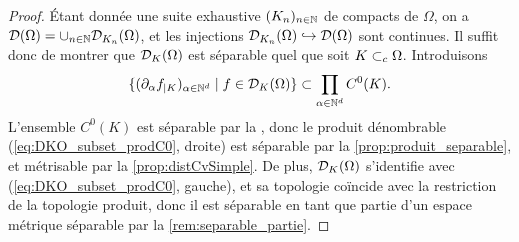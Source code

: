 \begin{proof}
	Étant donnée une suite exhaustive $(K_n)_{n\in \mathbb{N}}$ de compacts de $\Omega$, on a $\mathcal{D}(\Omega) = \cup_{n\in \mathbb{N}} \mathcal{D}_{K_n}(\Omega)$, et les injections $\mathcal{D}_{K_n}(\Omega) \hookrightarrow \mathcal{D}(\Omega)$ sont continues. Il suffit donc de montrer que $\mathcal{D}_K(\Omega)$ est séparable quel que soit $K \subset_c \Omega$. 
	Introduisons  
	\begin{equation}
	\label{eq:DKO_subset_prodC0}
		\{(\partial_\alpha f_{|K})_{\alpha \in \mathbb{N}^d} \mid f \in \mathcal{D}_K(\Omega)\} \subset \prod_{\alpha \in \mathbb{N}^d} C^0(K).
	\end{equation}
	L'ensemble $C^0(K)$ est séparable par la , donc le produit dénombrable (\ref{eq:DKO_subset_prodC0}, droite) est séparable par la \cref{prop:produit_separable}, et métrisable par la \cref{prop:distCvSimple}. De plus, $\mathcal{D}_K(\Omega)$ s'identifie avec (\ref{eq:DKO_subset_prodC0}, gauche), et sa topologie coïncide avec la restriction de la topologie produit, donc il est séparable en tant que partie d'un espace métrique séparable par la \cref{rem:separable_partie}.
\end{proof}


